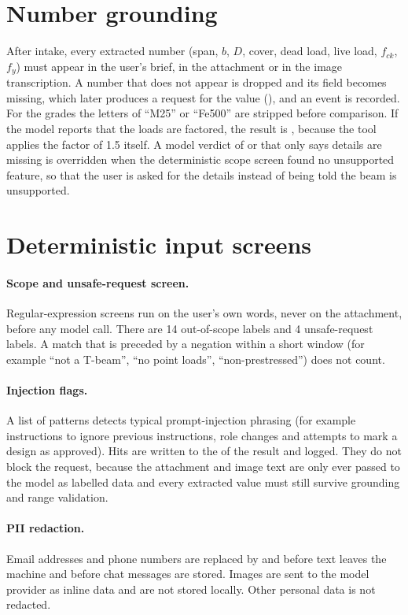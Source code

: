 \section{Number grounding}
After intake, every extracted number (span, $b$, $D$, cover, dead load, live load, $f_{ck}$, $f_y$) must appear in the user's brief, in the attachment or in the image transcription. A number that does not appear is dropped and its field becomes missing, which later produces a request for the value (), and an event  is recorded. For the grades the letters of ``M25'' or ``Fe500'' are stripped before comparison. If the model reports that the loads are factored, the result is , because the tool applies the factor of 1.5 itself. A model verdict of  or  that only says details are missing is overridden when the deterministic scope screen found no unsupported feature, so that the user is asked for the details instead of being told the beam is unsupported.

\section{Deterministic input screens}
\paragraph{Scope and unsafe-request screen.} Regular-expression screens run on the user's own words, never on the attachment, before any model call. There are 14 out-of-scope labels and 4 unsafe-request labels. A match that is preceded by a negation within a short window (for example ``not a T-beam'', ``no point loads'', ``non-prestressed'') does not count.
\paragraph{Injection flags.} A list of patterns detects typical prompt-injection phrasing (for example instructions to ignore previous instructions, role changes and attempts to mark a design as approved). Hits are written to the  of the result and logged. They do not block the request, because the attachment and image text are only ever passed to the model as labelled data and every extracted value must still survive grounding and range validation.
\paragraph{PII redaction.} Email addresses and phone numbers are replaced by \code{[email]} and \code{[phone]} before text leaves the machine and before chat messages are stored. Images are sent to the model provider as inline data and are not stored locally. Other personal data is not redacted.
